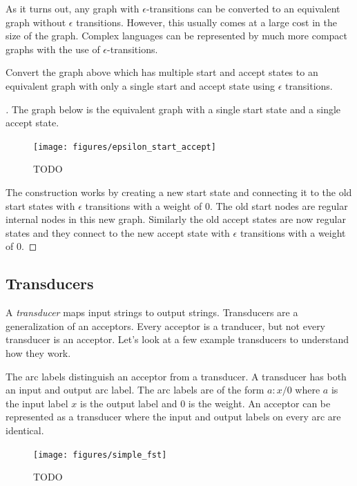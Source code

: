 \documentclass[main.tex]{subfiles}
\begin{document}
As it turns out, any graph with $\epsilon$-transitions can be converted to an
equivalent graph without $\epsilon$ transitions. However, this usually comes at
a large cost in the size of the graph. Complex languages can be represented by
much more compact graphs with the use of $\epsilon$-transitions.

\begin{example}
Convert the graph above which has multiple start and accept states to an
equivalent graph with only a single start and accept state using $\epsilon$
transitions.
\end{example}

\begin{proof}[\unskip\nopunct]
The graph below is the equivalent graph with a single start state and a single
accept state.

\begin{figure}
    \centering
    \texttt{[image: figures/epsilon\_start\_accept]}
    \caption{TODO}
    \label{fig:epsilon_start_accept}
\end{figure}

The construction works by creating a new start state and connecting it to the
old start states with $\epsilon$ transitions with a weight of $0$. The old
start nodes are regular internal nodes in this new graph. Similarly the old
accept states are now regular states and they connect to the new accept state
with $\epsilon$ transitions with a weight of $0$.
\end{proof}


\subsection{Transducers}

A \emph{transducer} maps input strings to output strings. Transducers are a
generalization of an acceptors. Every acceptor is a tranducer, but not every
transducer is an acceptor. Let's look at a few example transducers to
understand how they work.

The arc labels distinguish an acceptor from a transducer. A transducer has both
an input and output arc label. The arc labels are of the form $a\!:\!x/0$ where
$a$ is the input label $x$ is the output label and $0$ is the weight. An
acceptor can be represented as a transducer where the input and output labels
on every arc are identical.

\begin{figure}
    \centering
    \texttt{[image: figures/simple\_fst]}
    \caption{TODO}
    \label{fig:simple_fst}
\end{figure}
\end{document}

